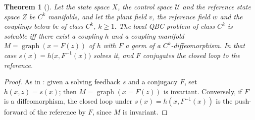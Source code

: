 \documentclass[11pt,reqno]{amsart}
\theoremstyle{plain}
\newtheorem*{theorem}{Theorem}
\theoremstyle{definition}
\theoremstyle{remark}
\DeclareMathOperator{\graph}{graph}
\begin{document}
\begin{theorem}[{\cite[Thm.~2.2]{Shosh1990}}]\label{thm:solvable}
Let the state space $X$, the control space $\mathcal U$ and the reference state space $Z$ be $C^{k}$ manifolds, and
let the plant field $v$, the reference field $w$ and the couplings below be of class $C^{k}$, $k\ge1$. The local
QBC problem of class $C^{k}$ is solvable iff there exist a coupling $h$ and a coupling
manifold $M=\graph(x=F(z))$ of $h$ with $F$ a germ of a $C^{k}$-diffeomorphism. In that case $s(x)=h\bigl(x,F^{-1}(x)\bigr)$ solves it, and $F$
conjugates the closed loop to the reference.
\end{theorem}
\begin{proof}
As in \cite[\S2]{Shosh1990}: given a solving feedback $s$ and a conjugacy $F$, set $h(x,z)=s(x)$; then
$M=\graph(x=F(z))$ is invariant. Conversely, if $F$ is a diffeomorphism, the closed loop under
$s(x)=h(x,F^{-1}(x))$ is the push-forward of the reference by $F$, since $M$ is invariant.
\end{proof}
\end{document}
